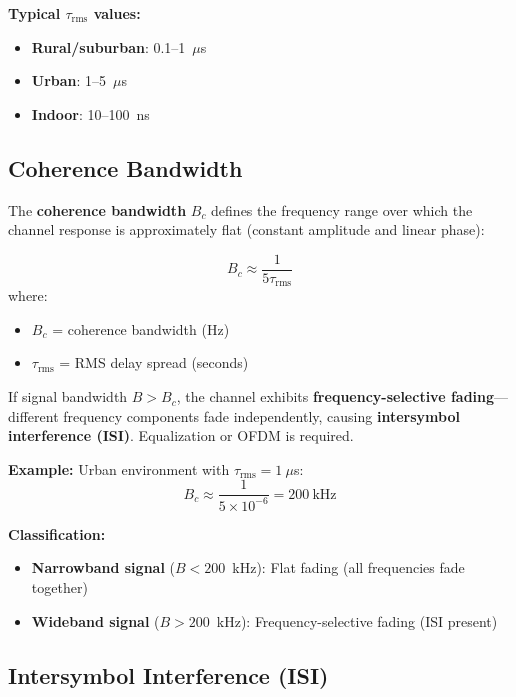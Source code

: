\textbf{Typical $\tau_{\text{rms}}$ values:}
\begin{itemize}
\item \textbf{Rural/suburban}: 0.1--1~$\mu$s
\item \textbf{Urban}: 1--5~$\mu$s
\item \textbf{Indoor}: 10--100~ns
\end{itemize}

\subsection{Coherence Bandwidth}

The \textbf{coherence bandwidth} $B_c$ defines the frequency range over which the channel response is approximately flat (constant amplitude and linear phase):

\begin{equation}
B_c \approx \frac{1}{5\tau_{\text{rms}}}
\end{equation}
where:
\begin{itemize}
\item $B_c$ = coherence bandwidth (Hz)
\item $\tau_{\text{rms}}$ = RMS delay spread (seconds)
\end{itemize}

\begin{warningbox}
If signal bandwidth $B > B_c$, the channel exhibits \textbf{frequency-selective fading}---different frequency components fade independently, causing \textbf{intersymbol interference (ISI)}. Equalization or OFDM is required.
\end{warningbox}

\textbf{Example:} Urban environment with $\tau_{\text{rms}} = 1~\mu$s:
\begin{equation}
B_c \approx \frac{1}{5 \times 10^{-6}} = 200~\text{kHz}
\end{equation}

\textbf{Classification:}
\begin{itemize}
\item \textbf{Narrowband signal} ($B < 200$~kHz): Flat fading (all frequencies fade together)
\item \textbf{Wideband signal} ($B > 200$~kHz): Frequency-selective fading (ISI present)
\end{itemize}

\subsection{Intersymbol Interference (ISI)}

